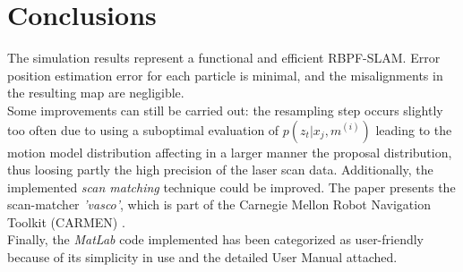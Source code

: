 \documentclass[letterpaper]{article}
\begin{document}
\section{Conclusions}
The simulation results represent a functional and efficient RBPF-SLAM. Error position estimation error for each particle is minimal, and the misalignments in the resulting map are negligible.\\
Some improvements can still be carried out: the resampling step occurs slightly too often due to using a suboptimal evaluation of $p(z_t|x_j, m^{(i)})$ leading to the motion model distribution affecting in a larger manner the proposal distribution, thus loosing partly the high precision of the laser scan data. Additionally, the implemented \textit{scan matching} technique could be improved. The paper \cite{Cyrill} presents the scan-matcher \textit{'vasco'}, which is part of the Carnegie Mellon Robot Navigation Toolkit (CARMEN) \cite{Carmen}.\\
Finally, the \textit{MatLab} code implemented has been categorized as user-friendly because of its simplicity in use and the detailed User Manual attached.



\end{document}
